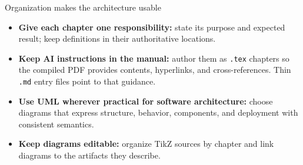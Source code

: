 \begin{frame}{Organization makes the architecture usable}
\begin{itemize}
  \item \textbf{Give each chapter one responsibility:} state its purpose and expected result; keep definitions in their authoritative locations.
  \item \textbf{Keep AI instructions in the manual:} author them as \texttt{.tex} chapters so the compiled PDF provides contents, hyperlinks, and cross-references. Thin \texttt{.md} entry files point to that guidance.
  \item \textbf{Use UML wherever practical for software architecture:} choose diagrams that express structure, behavior, components, and deployment with consistent semantics.
  \item \textbf{Keep diagrams editable:} organize TikZ sources by chapter and link diagrams to the artifacts they describe.
\end{itemize}
\end{frame}
